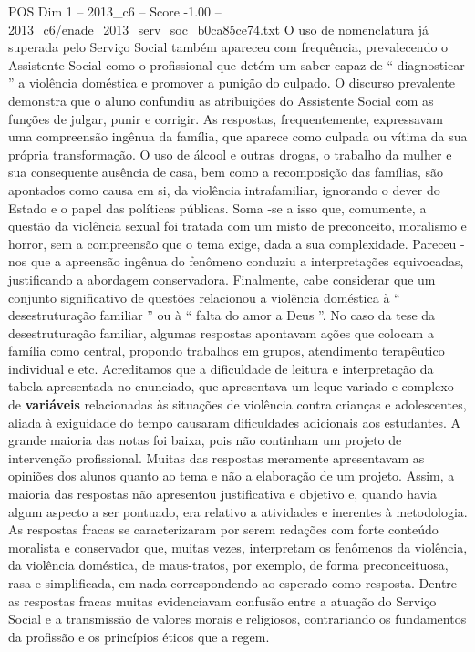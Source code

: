 \begin{textsample}{POS Dim 1 – 2013\_c6 – Score -1.00 – 2013\_c6/enade\_2013\_serv\_soc\_b0ca85ce74.txt}
O uso de nomenclatura já superada pelo Serviço Social também apareceu com frequência, prevalecendo o Assistente Social como o profissional que detém um saber capaz de “ diagnosticar ” a violência doméstica e promover a punição do culpado.
O discurso prevalente demonstra que o aluno confundiu as atribuições do Assistente Social com as funções de julgar, punir e corrigir.
As respostas, frequentemente, expressavam uma compreensão ingênua da família, que aparece como culpada ou vítima da sua própria transformação.
O uso de álcool e outras drogas, o trabalho da mulher e sua consequente ausência de casa, bem como a recomposição das famílias, são apontados como causa em si, da violência intrafamiliar, ignorando o dever do Estado e o papel das políticas públicas.
Soma -se a isso que, comumente, a questão da violência sexual foi tratada com um misto de preconceito, moralismo e horror, sem a compreensão que o tema exige, dada a sua complexidade.
Pareceu -nos que a apreensão ingênua do fenômeno conduziu a interpretações equivocadas, justificando a abordagem conservadora.
Finalmente, cabe considerar que um conjunto significativo de questões relacionou a violência doméstica à “ desestruturação familiar ” ou à “ falta do amor a Deus ”.
No caso da tese da desestruturação familiar, algumas respostas apontavam ações que colocam a família como central, propondo trabalhos em grupos, atendimento terapêutico individual e etc.
Acreditamos que a dificuldade de leitura e interpretação da tabela apresentada no enunciado, que apresentava um leque variado e complexo de \textbf{variáveis} relacionadas às situações de violência contra crianças e adolescentes, aliada à exiguidade do tempo causaram dificuldades adicionais aos estudantes.
A grande maioria das notas foi baixa, pois não continham um projeto de intervenção profissional.
Muitas das respostas meramente apresentavam as opiniões dos alunos quanto ao tema e não a elaboração de um projeto.
Assim, a maioria das respostas não apresentou justificativa e objetivo e, quando havia algum aspecto a ser pontuado, era relativo a atividades e inerentes à metodologia.
As respostas fracas se caracterizaram por serem redações com forte conteúdo moralista e conservador que, muitas vezes, interpretam os fenômenos da violência, da violência doméstica, de maus-tratos, por exemplo, de forma preconceituosa, rasa e simplificada, em nada correspondendo ao esperado como resposta.
Dentre as respostas fracas muitas evidenciavam confusão entre a atuação do Serviço Social e a transmissão de valores morais e religiosos, contrariando os fundamentos da profissão e os princípios éticos que a regem.

\end{textsample}

